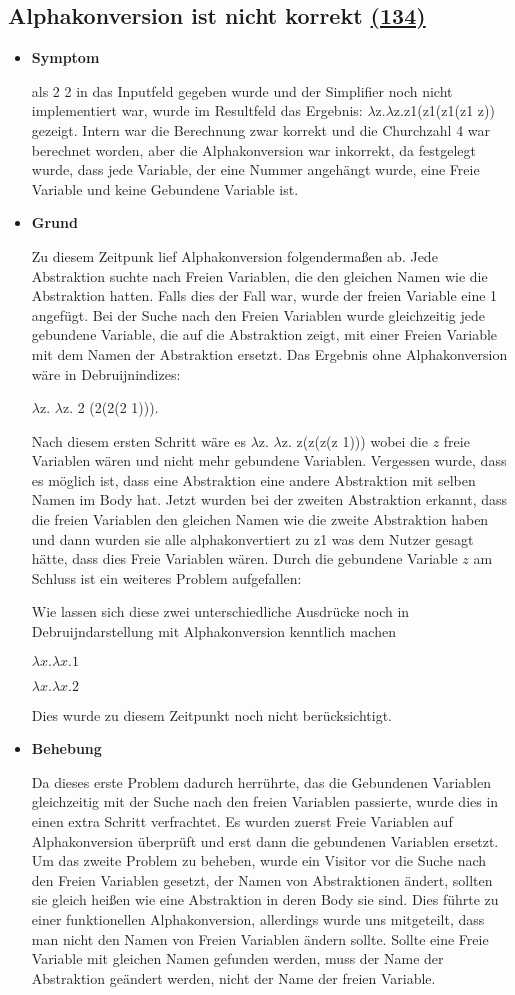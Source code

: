 \documentclass[parskip=full,11pt,twoside]{scrartcl}
\newcommand{\issueref}[1]{
    \href{https://git.scc.kit.edu/ap/Aurora/issues/#1}{(#1)}
}
\newcommand{\regrtest}[5]{
    \subsection{#1 \issueref{#2}}
    \begin{itemize}
        \item \textbf{Symptom}
            #3
        \item \textbf{Grund}
            #4
        \item \textbf{Behebung}
            #5
    \end{itemize}
}
\begin{document}
 \regrtest{Alphakonversion ist nicht korrekt}{134}{
 als 2 2 in das Inputfeld gegeben wurde und der Simplifier noch nicht implementiert war, wurde im Resultfeld das
 Ergebnis: $\lambda$z.$\lambda$z.z1(z1(z1(z1 z)) gezeigt.
 Intern war die Berechnung zwar korrekt und die Churchzahl 4 war berechnet worden,
  aber die Alphakonversion war inkorrekt, da festgelegt wurde, dass jede
 Variable, der eine Nummer angehängt wurde, eine Freie Variable und keine Gebundene Variable ist.
}{
Zu diesem Zeitpunk lief Alphakonversion folgendermaßen ab.
Jede Abstraktion suchte nach Freien Variablen, die den gleichen Namen wie
die Abstraktion hatten. Falls dies der Fall war, wurde der freien Variable eine 1 angefügt.
Bei der Suche nach den Freien Variablen wurde gleichzeitig jede gebundene Variable, die auf die Abstraktion zeigt,
mit einer Freien Variable mit dem Namen der Abstraktion ersetzt.
Das Ergebnis ohne Alphakonversion wäre in Debruijnindizes:

$\lambda$z. $\lambda$z. 2 (2(2(2 1))).

Nach diesem ersten Schritt wäre es $\lambda$z. $\lambda$z. z(z(z(z 1))) wobei die $z$ freie Variablen wären und nicht
mehr gebundene Variablen.
Vergessen wurde, dass es möglich ist, dass eine Abstraktion eine andere Abstraktion mit selben Namen im Body hat.
 Jetzt wurden bei der zweiten Abstraktion erkannt, dass die freien Variablen den gleichen Namen wie die zweite
 Abstraktion haben und dann wurden sie alle alphakonvertiert zu z1 was dem Nutzer gesagt hätte, dass dies Freie
 Variablen wären. Durch die gebundene Variable $z$ am Schluss ist ein weiteres Problem aufgefallen:

 Wie lassen sich diese  zwei unterschiedliche Ausdrücke noch in Debruijndarstellung mit Alphakonversion
 kenntlich machen

 $\lambda x.\lambda x. 1$

 $\lambda x. \lambda x. 2$

 Dies wurde zu diesem Zeitpunkt noch nicht berücksichtigt.
}{
Da dieses erste Problem dadurch herrührte, das die Gebundenen Variablen gleichzeitig mit der Suche nach den freien
Variablen passierte, wurde dies in einen extra Schritt verfrachtet.
 Es wurden zuerst Freie Variablen auf Alphakonversion
überprüft und erst dann die gebundenen Variablen ersetzt.
Um das zweite Problem zu beheben, wurde ein Visitor vor die Suche nach den Freien Variablen gesetzt, der Namen von
Abstraktionen ändert, sollten sie gleich heißen wie eine Abstraktion in deren Body sie sind.
Dies führte zu einer funktionellen Alphakonversion, allerdings wurde uns mitgeteilt, dass man nicht den Namen von
Freien Variablen ändern sollte.
Sollte eine Freie Variable mit gleichen Namen gefunden werden, muss der Name der Abstraktion geändert werden, nicht
der Name der freien Variable.

}
\end{document}
